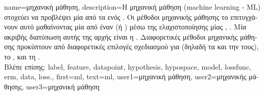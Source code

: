 {name={\foreignlanguage{greek}{μηχανική μάθηση}},
	description={\foreignlanguage{greek}{Η μηχανική μάθηση} (machine learning - ML) 
		\foreignlanguage{greek}{στοχεύει να προβλέψει μία}  \foreignlanguage{greek}{από τα}  
		\foreignlanguage{greek}{ενός} . \foreignlanguage{greek}{Οι μέθοδοι μηχανικής μάθησης το επιτυγχάνουν αυτό 
	 	μαθαίνοντας μία}  \foreignlanguage{greek}{από έναν}  (\foreignlanguage{greek}{ή} ) 
	 	\foreignlanguage{greek}{μέσω της ελαχιστο\-ποί\-ησης μίας}  \cite{MLBasics}, \cite{HastieWainwrightBook}. 
	 	\foreignlanguage{greek}{Μία ακριβής διατύπωση αυτής της αρχής είναι η} . \foreignlanguage{greek}{Διαφορετικές 
		μέθοδοι μηχανικής μάθησης προκύπτουν από διαφορετικές επιλογές σχεδιασμού για}  (\foreignlanguage{greek}{δηλαδή 
		τα}  \foreignlanguage{greek}{και την}  \foreignlanguage{greek}{τους}), \foreignlanguage{greek}{το} 
	 	, \foreignlanguage{greek}{και τη}  \cite[\foreignlanguage{greek}{Κεφ.} 3]{MLBasics}.\\
	 	\foreignlanguage{greek}{Βλέπε επίσης:} \gls{label}, \gls{feature}, \gls{datapoint}, \gls{hypothesis}, \gls{hypospace}, \gls{model}, \gls{lossfunc}, \gls{erm}, 
		\gls{data}, \gls{loss}.},
	first={ml},
	text={ml},
	user1={\foreignlanguage{greek}{μηχανική μάθηση}}, %
	user2={\foreignlanguage{greek}{μηχανικής μά\-θη\-σης}}, %
	user3={\foreignlanguage{greek}{μηχανική μάθηση}} %
} 

